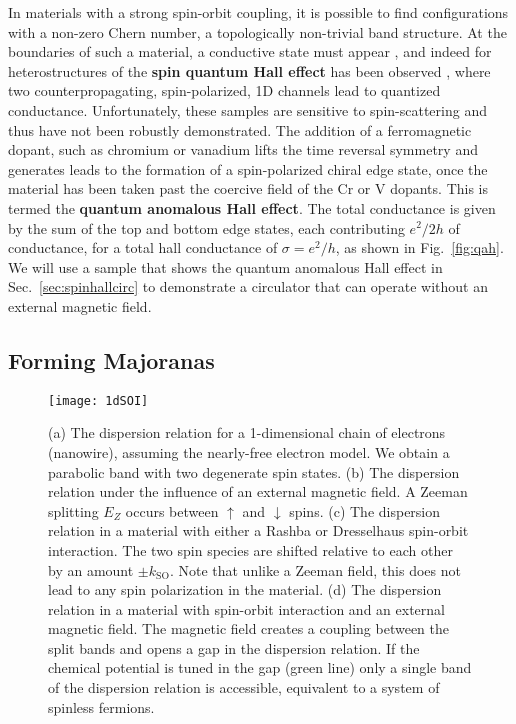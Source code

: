 In materials with a strong spin-orbit coupling, it is possible to find configurations with a non-zero Chern number, a topologically non-trivial band structure.
At the boundaries of such a material, a conductive state must appear \cite{PhysRevLett.93.156804,PhysRevLett.92.126603}, and indeed for heterostructures of 
the \textbf{spin quantum Hall effect} has been observed \cite{Konig766}, where two counterpropagating, spin-polarized, 1D channels lead to quantized conductance. Unfortunately, these
samples are sensitive to spin-scattering and thus have not been robustly demonstrated. The addition of a ferromagnetic dopant, such as chromium or vanadium lifts the
time reversal symmetry and generates leads to the formation of a spin-polarized chiral edge state, once the material has been taken past the coercive field of the
Cr or V dopants. This is termed the \textbf{quantum anomalous Hall effect}. The total conductance is given by the sum of the top and bottom edge states,
each contributing $e^2/2h$ of conductance, for a total hall conductance of $\sigma = e^2/h$, as shown in Fig.~\ref{fig:qah}. We will use a sample that shows the
quantum anomalous Hall effect in Sec.~\ref{sec:spinhallcirc} to demonstrate a circulator that can operate without an external magnetic field.

\subsection{Forming Majoranas}
\label{sec:makemajo}

\begin{figure}
  \texttt{[image: 1dSOI]}
  \caption[Spin-orbit interaction in a nanowire with a magnetic field]
  {\label{fig:1dsoi}(a) The dispersion relation for a 1-dimensional chain of electrons (nanowire), assuming the nearly-free electron model. We obtain a parabolic band with two degenerate spin states. (b) The dispersion relation under the influence of an external magnetic field. A Zeeman splitting $E_Z$ occurs
  between $\uparrow$ and $\downarrow$ spins. (c) The dispersion relation in a material with either a Rashba or Dresselhaus spin-orbit interaction. The two spin species are shifted relative to each other by an amount $\pm k_\textrm{SO}$. Note that unlike a Zeeman field, this does not lead to any spin polarization in the material. (d) The dispersion relation in a material with spin-orbit interaction and an external magnetic field. The magnetic field creates a coupling between the split bands and opens a gap in the dispersion relation. If the chemical potential is tuned in the gap (green line) only a single band of the
  dispersion relation is accessible, equivalent to a system of spinless fermions.}
\end{figure}

